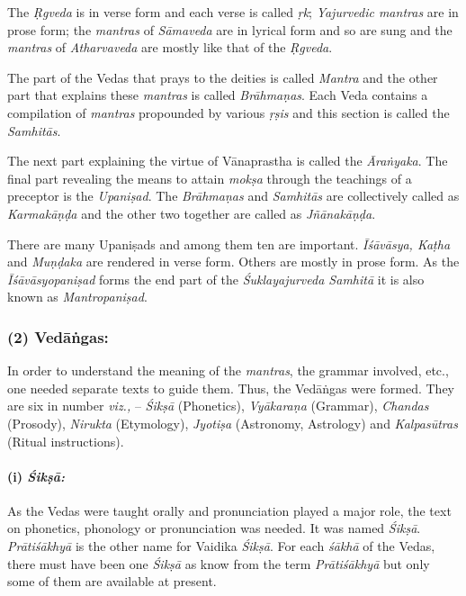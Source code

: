 The \textit{Ṛgveda} is in verse form and each verse is called \textit{ṛk}; \textit{Yajurvedic mantras} are in prose form; the \textit{mantras} of \textit{Sāmaveda} are in lyrical form and so are sung and the \textit{mantras} of \textit{Atharvaveda} are mostly like that of the \textit{Ṛgveda}.

The part of the Vedas that prays to the deities is called \textit{Mantra} and the other part that explains these \textit{mantras} is called \textit{Brāhmaṇas}. Each Veda contains a compilation of \textit{mantras} propounded by various \textit{ṛṣis} and this section is called the \textit{Samhitās}.

The next part explaining the virtue of Vānaprastha is called the \textit{Āraṅyaka}. The final part revealing the means to attain \textit{mokṣa} through the teachings of a preceptor is the \textit{Upaniṣad}. The \textit{Brāhmaṇas} and \textit{Samhitās} are collectively called as \textit{Karmakāṇḍa} and the other two together are called as \textit{Jñānakāṇḍa}.

There are many Upaniṣads and among them ten are important. \textit{Īśāvāsya, Kaṭha} and \textit{Muṇḍaka} are rendered in verse form. Others are mostly in prose form. As the \textit{Īśāvāsyopaniṣad} forms the end part of the \textit{Śuklayajurveda Samhitā} it is also known as \textit{Mantropaniṣad}.


\subsubsection*{(2) Vedāṅgas:}

\vskip -7pt

In order to understand the meaning of the \textit{mantras}, the grammar involved, etc., one needed separate texts to guide them. Thus, the Vedāṅgas were formed. They are six in number \textit{viz.,} – \textit{Śikṣā} (Phonetics), \textit{Vyākaraṇa} (Grammar), \textit{Chandas} (Prosody), \textit{Nirukta} (Etymology), \textit{Jyotiṣa} (Astronomy, Astrology) and \textit{Kalpasūtras} (Ritual instructions).

\paragraph*{(i) \textit{Śikṣā:}}

\vskip -7.3pt

As the Vedas were taught orally and pronunciation played a major role, the text on phonetics, phonology or pronunciation was needed. It was named \textit{Śikṣā}. \textit{Prātiśākhyā} is the other name for Vaidika \textit{Śikṣā}. For each \textit{śākhā} of the Vedas, there must have been one \textit{Śikṣā} as know from the term \textit{Prātiśākhyā} but only some of them are available at present.

